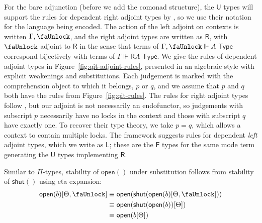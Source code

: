 \documentclass[10pt]{article}
\theoremstyle{definition}
\newcommand{\TYPE}{\,\,\mathsf{Type}}
\newcommand{\qyields}{\Vdash}
\newcommand{\lock}{\text{\faUnlock}}
\newcommand{\Rtype}[1]{\mathsf{R}{#1}}
\newcommand{\RI}[1]{\mathsf{shut}({#1})}
\newcommand{\RE}[1]{\mathsf{open}({#1})}
\newcommand{\Ltype}[1]{\mathsf{L}{#1}}
\begin{document}
For the bare adjunction (before we add the comonad structure), the
$\mathsf{U}$ types will support the rules for dependent right adjoint
types by \citet{birkedal+18rightadjoint}, so we use their notation for
the language being encoded.  The action of the left adjoint on contexts
is written $\Gamma,\lock$, and the right adjoint types are written as
$\Rtype{}$, with $\lock$ adjoint to $\Rtype{}$ in the sense that terms
of $\Gamma, \lock \qyields A \TYPE$ correspond bijectively with terms of
$\Gamma \qyields \Rtype{A} \TYPE$.  We give the rules of dependent
adjoint types in Figure~\ref{fig:qit-adjoint-rules}, presented in an
algebraic style with explicit weakenings and substitutions.  Each
judgement is marked with the comprehension object to which it belongs,
$p$ or $q$, and we assume that $p$ and $q$ both have the rules from
Figure~\ref{fig:qit-rules}.  The rules for right adjoint types follow
\citet{birkedal+18rightadjoint}, but our adjoint is not necessarily an
endofunctor, so judgements with subscript $p$ necessarily have no locks
in the context and those with subscript $q$ have exactly one.  To
recover their type theory, we take $p = q$, which allows a context to
contain multiple locks.  The framework suggests rules for dependent
\emph{left} adjoint types, which we write as $\Ltype{}$; these are the
$\mathsf{F}$ types for the same mode term generating the $\mathsf{U}$
types implementing $\mathsf{R}$.

Similar to $\Pi$-types, stability of $\RE{}$ under substitution follows from stability of $\RI{}$ using eta expansion:
\begin{align*}
\RE{b}[\Theta, \lock] 
&\equiv \RE{\RI{\RE{b}[\Theta, \lock]}} \\
&\equiv \RE{\RI{\RE{b}}[\Theta]} \\
&\equiv \RE{b[\Theta]}
\end{align*}
\end{document}
